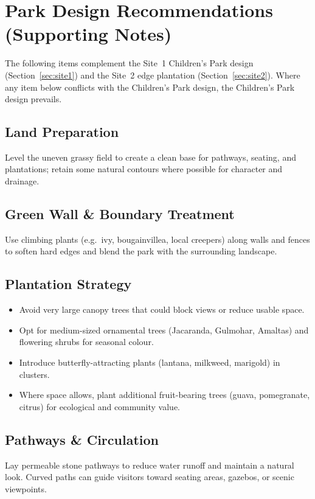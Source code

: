 \documentclass[11pt,a4paper]{article}
\begin{document}
\section{Park Design Recommendations (Supporting Notes)}
\label{sec:park-design}

The following items complement the Site~1 Children's Park design (Section~\ref{sec:site1}) and the Site~2 edge plantation (Section~\ref{sec:site2}). Where any item below conflicts with the Children's Park design, the Children's Park design prevails.

\subsection{Land Preparation}
Level the uneven grassy field to create a clean base for pathways, seating, and plantations; retain some natural contours where possible for character and drainage.

\subsection{Green Wall \& Boundary Treatment}
Use climbing plants (e.g.\ ivy, bougainvillea, local creepers) along walls and fences to soften hard edges and blend the park with the surrounding landscape.

\subsection{Plantation Strategy}
\begin{itemize}
  \item Avoid very large canopy trees that could block views or reduce usable space.
  \item Opt for medium-sized ornamental trees (Jacaranda, Gulmohar, Amaltas) and flowering shrubs for seasonal colour.
  \item Introduce butterfly-attracting plants (lantana, milkweed, marigold) in clusters.
  \item Where space allows, plant additional fruit-bearing trees (guava, pomegranate, citrus) for ecological and community value.
\end{itemize}

\subsection{Pathways \& Circulation}
Lay permeable stone pathways to reduce water runoff and maintain a natural look. Curved paths can guide visitors toward seating areas, gazebos, or scenic viewpoints.
\end{document}
